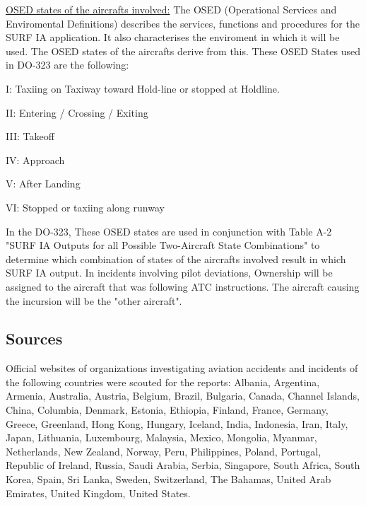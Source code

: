 \underline {OSED states of the aircrafts involved:}
The OSED (Operational Services and Enviromental Definitions) describes the services, functions and procedures for the SURF IA application. It also characterises the enviroment in which it will be used. The OSED states of the aircrafts  derive from this. These OSED States used in DO-323 are the following:

I: Taxiing on Taxiway toward Hold-line or stopped at Holdline.

II: Entering / Crossing / Exiting

III: Takeoff

IV: Approach

V: After Landing

VI: Stopped or taxiing along runway

In the DO-323, These OSED states are used in conjunction with Table A-2 "SURF IA Outputs for all Possible Two-Aircraft State Combinations" to determine which combination of states of the aircrafts involved result in which SURF IA output. In incidents involving pilot deviations, Ownership will be assigned to the aircraft that was following ATC instructions. The aircraft causing the incursion will be the "other aircraft".

\subsection{Sources}
Official websites of organizations investigating aviation accidents and incidents of the following countries were scouted for the reports: Albania, Argentina, Armenia, Australia, Austria, Belgium, Brazil, Bulgaria, Canada, Channel Islands, China, Columbia, Denmark, Estonia, Ethiopia, Finland, France, Germany, Greece, Greenland, Hong Kong, Hungary, Iceland, India, Indonesia, Iran, Italy, Japan, Lithuania, Luxembourg, Malaysia, Mexico, Mongolia, Myanmar, Netherlands, New Zealand, Norway, Peru, Philippines, Poland, Portugal, Republic of Ireland, Russia, Saudi Arabia, Serbia, Singapore, South Africa, South Korea, Spain, Sri Lanka, Sweden, Switzerland, The Bahamas, United Arab Emirates, United Kingdom, United States.

